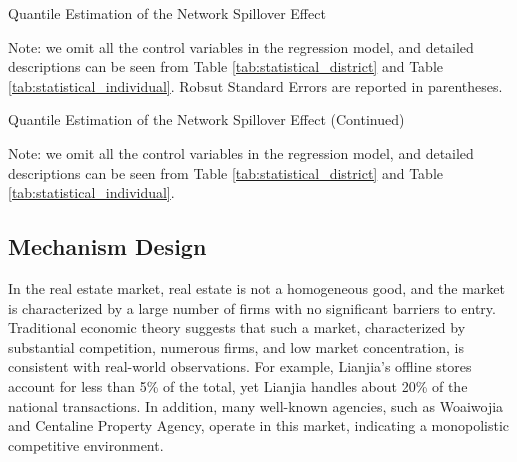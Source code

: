 \documentclass[11pt]{article}
\begin{document}
\begin{table}
  \begin{center}
    \begin{scriptsize}
      \caption{Quantile Estimation of the Network Spillover Effect}
      \label{tab:quantile_estimate_network_1}
      
    
    Note: we omit all the control variables in the regression model, and detailed descriptions can be seen from Table \ref{tab:statistical_district} and Table \ref{tab:statistical_individual}. Robsut Standard Errors are reported in parentheses.
    \end{scriptsize}
  \end{center}
\end{table}

\begin{table}
  \begin{center}
    \begin{scriptsize}
      \caption{Quantile Estimation of the Network Spillover Effect (Continued)}
      \label{tab:quantile_estimate_network_2}
      
    
    Note: we omit all the control variables in the regression model, and detailed descriptions can be seen from Table \ref{tab:statistical_district} and Table \ref{tab:statistical_individual}.
    \end{scriptsize}
  \end{center}
\end{table}

\subsection{Mechanism Design} \label{subsec:mechanism_network_design}

In the real estate market, real estate is not a homogeneous good, and the market is characterized by a large number of firms with no significant barriers to entry. Traditional economic theory suggests that such a market, characterized by substantial competition, numerous firms, and low market concentration, is consistent with real-world observations. For example, Lianjia's offline stores account for less than 5\% of the total, yet Lianjia handles about 20\% of the national transactions. In addition, many well-known agencies, such as Woaiwojia and Centaline Property Agency, operate in this market, indicating a monopolistic competitive environment.
\end{document}

